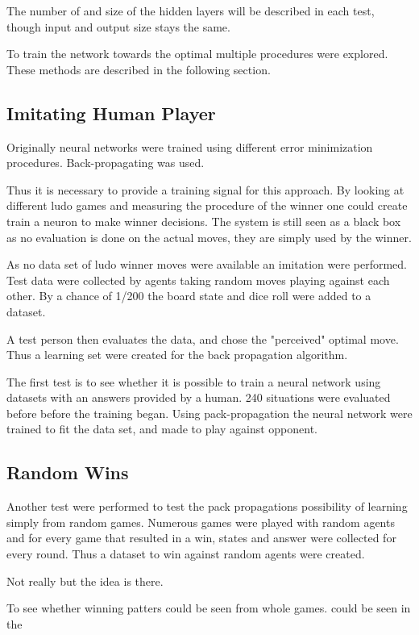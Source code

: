 \documentclass{llncs}
\begin{document}
The number of and size of the hidden layers will be described in each test, though input and output size stays the same.

To train the network towards the optimal multiple procedures were explored. These methods are described in the following section.

\subsection*{Imitating Human Player}
 

Originally neural networks were trained using different error minimization procedures. 
Back-propagating was used.


Thus it is necessary to provide a training signal for this approach. By looking at different ludo games and measuring the procedure of the winner one could create train a neuron to make winner decisions. The system is still seen as a black box as no evaluation is done on the actual moves, they are simply used by the winner.

As no data set of ludo winner moves were available an imitation were performed. Test data were collected by agents taking random moves playing against each other. By a chance of 1/200 the board state and dice roll were added to a dataset. 

A test person then evaluates the data, and chose the "perceived" optimal move. Thus a learning set were created for the back propagation algorithm.

The first test is to see whether it is possible to train a neural network using datasets with an answers provided by a human. 240 situations were evaluated before before the training began. Using pack-propagation the neural network were trained to fit the data set, and made to play against opponent. 


\subsection*{Random Wins}

Another test were performed to test the pack propagations possibility of learning simply from random games. Numerous games were played with random agents and for every game that resulted in a win, states and answer were collected for every round. Thus a dataset to win against random agents were created. 

Not really but the idea is there.

To see whether winning patters could be seen from whole games.  could be seen in the 
\end{document}
